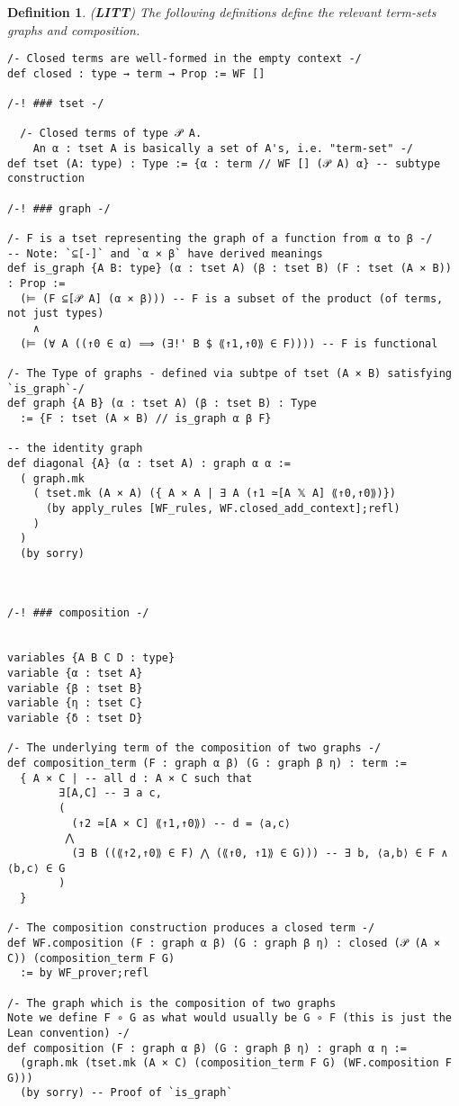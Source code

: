 \documentclass[12pt,leqno]{article}
\theoremstyle{example}
\newtheorem{definition}[theorem]{Definition}
\numberwithin{equation}{section}
\begin{document}
\begin{definition}(\textbf{LITT})
  The following definitions define the relevant \emph{term-sets} \emph{graphs} and \emph{composition}. 
\begin{lstlisting}
/- Closed terms are well-formed in the empty context -/
def closed : type → term → Prop := WF []

/-! ### tset -/

  /- Closed terms of type 𝒫 A.
    An α : tset A is basically a set of A's, i.e. "term-set" -/
def tset (A: type) : Type := {α : term // WF [] (𝒫 A) α} -- subtype construction

/-! ### graph -/

/- F is a tset representing the graph of a function from α to β -/
-- Note: `⊆[-]` and `α × β` have derived meanings
def is_graph {A B: type} (α : tset A) (β : tset B) (F : tset (A × B)) : Prop :=
  (⊨ (F ⊆[𝒫 A] (α × β))) -- F is a subset of the product (of terms, not just types)
    ∧
  (⊨ (∀ A ((↑0 ∈ α) ⟹ (∃!' B $ ⟪↑1,↑0⟫ ∈ F)))) -- F is functional

/- The Type of graphs - defined via subtpe of tset (A × B) satisfying `is_graph`-/
def graph {A B} (α : tset A) (β : tset B) : Type
  := {F : tset (A × B) // is_graph α β F}

-- the identity graph
def diagonal {A} (α : tset A) : graph α α :=
  ( graph.mk 
    ( tset.mk (A × A) ({ A × A | ∃ A (↑1 ≃[A 𝕏 A] ⟪↑0,↑0⟫)})
      (by apply_rules [WF_rules, WF.closed_add_context];refl)
    )
  ) 
  (by sorry)



/-! ### composition -/


variables {A B C D : type}
variable {α : tset A}
variable {β : tset B}
variable {η : tset C}
variable {δ : tset D}

/- The underlying term of the composition of two graphs -/
def composition_term (F : graph α β) (G : graph β η) : term :=
  { A × C | -- all d : A × C such that
        ∃[A,C] -- ∃ a c,
        (
          (↑2 ≃[A × C] ⟪↑1,↑0⟫) -- d = ⟨a,c⟩
         ⋀
          (∃ B ((⟪↑2,↑0⟫ ∈ F) ⋀ (⟪↑0, ↑1⟫ ∈ G))) -- ∃ b, ⟨a,b⟩ ∈ F ∧ ⟨b,c⟩ ∈ G
        )
  }

/- The composition construction produces a closed term -/
def WF.composition (F : graph α β) (G : graph β η) : closed (𝒫 (A × C)) (composition_term F G)
  := by WF_prover;refl

/- The graph which is the composition of two graphs 
Note we define F ∘ G as what would usually be G ∘ F (this is just the Lean convention) -/
def composition (F : graph α β) (G : graph β η) : graph α η :=
  (graph.mk (tset.mk (A × C) (composition_term F G) (WF.composition F G)))
  (by sorry) -- Proof of `is_graph`
  
\end{lstlisting}
\end{definition}
\end{document}
